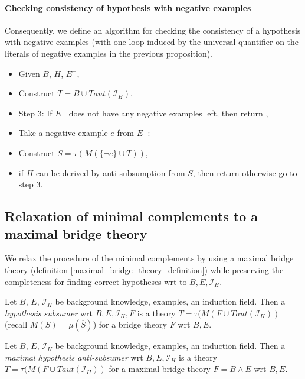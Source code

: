 \paragraph{Checking consistency of hypothesis with negative examples}
Consequently, we define an algorithm for checking the consistency of a hypothesis with negative examples (with one loop induced by the universal quantifier on the literals of negative examples in the previous proposition).

\begin{itemize}
\item Given $B$, $H$, $E^-$,
\item Construct $T=B \cup Taut(\mathcal{I}_H)$,
\item Step 3: If $E^-$ does not have any negative examples left, then return ,
\item Take a negative example $e$ from $E^-$:
\item Construct $S=\tau(M(\{\neg e\} \cup T))$,
\item if $H$ can be derived by anti-subsumption from $S$,
then return  otherwise go to step 3.
\end{itemize}

\subsection{Relaxation of minimal complements to a maximal bridge theory}
We relax the procedure of the minimal complements by using a maximal bridge theory (definition \ref{maximal_bridge_theory_definition}) while preserving the completeness for finding correct hypotheses wrt to $B, E, \mathcal{I}_H$.

\begin{defn}
Let $B$, $E$, $\mathcal{I}_H$ be background knowledge, examples, an induction field. Then a \emph{hypothesis subsumer} wrt $B, E, \mathcal{I}_H, F$ is a theory
$T=\tau(M(F \cup Taut(\mathcal{I}_H))$ (recall $M(S)=\mu(\overline{S})$) for a bridge theory $F$ wrt $B, E$.
\end{defn}

\begin{defn}
Let $B$, $E$, $\mathcal{I}_H$ be background knowledge, examples, an induction field. Then a \emph{maximal hypothesis anti-subsumer} wrt $B, E, \mathcal{I}_H$ is a theory
$T=\tau(M(F \cup Taut(\mathcal{I}_H))$ for a maximal bridge theory $F=B \land \overline{E}$ wrt $B, E$.
\end{defn}

